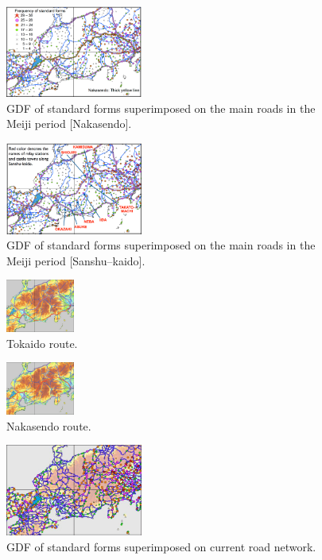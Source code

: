 \documentclass[output=paper]{LSP/langsci}
\begin{document}
\begin{figure}
\includegraphics[width=0.4\textwidth]{illustrations/kuma_fig09}
\caption{GDF of standard forms superimposed on the main roads in the Meiji period [Nakasendo].}          
\label{fig:9}
\end{figure}

\begin{figure}
\includegraphics[width=0.4\textwidth]{illustrations/kuma_fig10}
\caption{GDF of standard forms superimposed on the main roads in the Meiji period [Sanshu--kaido].}          
\label{fig:10}
\end{figure}

\begin{figure}
\includegraphics[width=0.2\textwidth]{illustrations/kuma_fig11}
\caption{Tokaido route.}          
\label{fig:11}
\end{figure}

\begin{figure}
\includegraphics[width=0.2\textwidth]{illustrations/kuma_fig12}
\caption{Nakasendo route.}          
\label{fig:12}
\end{figure}

\begin{figure}
\includegraphics[width=0.4\textwidth]{illustrations/kuma_fig13}
\caption{GDF of standard forms superimposed on current road network.}          
\label{fig:13}
\end{figure}
\end{document}
